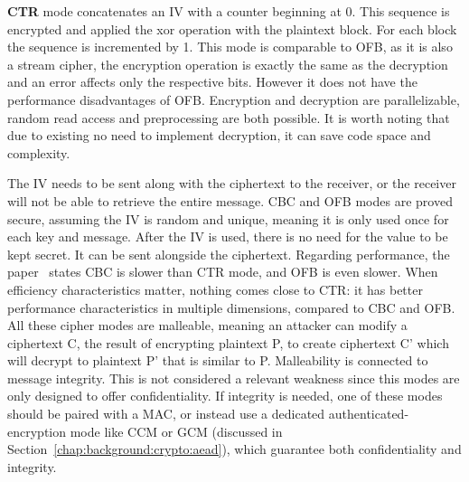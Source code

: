 %
\textbf{\ac{CTR}} mode concatenates an IV with a counter beginning at 0. This sequence is encrypted and applied the xor operation with the plaintext block. For each block the sequence is incremented by 1.
This mode is comparable to \ac{OFB}, as it is also a stream cipher, the encryption operation is exactly the same as the decryption and an error affects only the respective bits.
However it does not have the performance disadvantages of \ac{OFB}. Encryption and decryption are parallelizable, random read access and preprocessing are both possible.
It is worth noting that due to existing no need to implement decryption, it can save code space and complexity.

The \ac{IV} needs to be sent along with the ciphertext to the receiver, or the receiver will not be able to retrieve the entire message.
\ac{CBC} and \ac{OFB} modes are proved secure, assuming the \ac{IV} is random and unique, meaning it is only used once for each key and message.
After the \ac{IV} is used, there is no need for the value to be kept secret. It can be sent alongside the ciphertext.
Regarding performance, the paper~\cite{aesmodes} states \ac{CBC} is slower than \ac{CTR} mode, and \ac{OFB} is even slower.
When efficiency characteristics matter, nothing comes close to \ac{CTR}: it has better performance characteristics in multiple dimensions, compared to \ac{CBC} and \ac{OFB}.
All these cipher modes are malleable, meaning an attacker can modify a ciphertext C, the result of encrypting plaintext P, to create ciphertext C' which will decrypt to plaintext P' that is similar to P. Malleability is connected to message integrity. This is not considered a relevant weakness since this modes are only designed to offer confidentiality. If integrity is needed, one of these modes should be paired with a \ac{MAC}, or instead use a dedicated authenticated-encryption mode like \ac{CCM} or \ac{GCM} (discussed in Section~\ref{chap:background:crypto:aead}), which guarantee both confidentiality and integrity.

